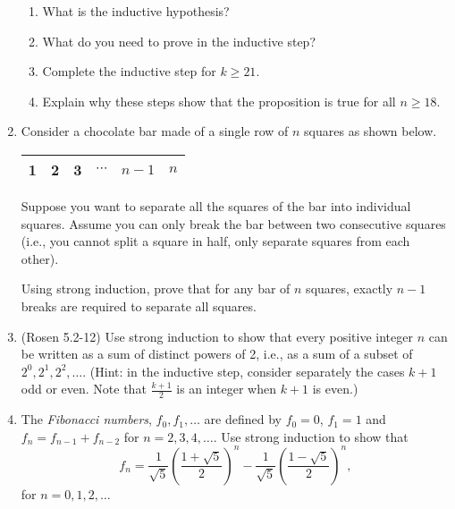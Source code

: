\begin{enumerate}
\begin{enumerate}
\item \streasy What is the inductive hypothesis?

\item \streasy What do you need to prove in the inductive step?

\item \strhard Complete the inductive step for $k \geq 21$.
  
\item \strmedium Explain why these steps show that the proposition is true for all $n \geq 18$.
\end{enumerate}

\item \strmedium Consider a chocolate bar made of a single row of $n$ squares as shown below.

\begin{center}
\begin{tabular}{|C{8mm}||C{8mm}||C{8mm}||C{8mm}||C{8mm}||C{8mm}|}
 & 2 & 3 & $\cdots$ & $n{-}1$ & $n$ \\
\hline 
\end{tabular}
\end{center}

Suppose you want to separate all the squares of the bar into individual squares. Assume you can only break the bar between two consecutive squares (i.e., you cannot split a square in half, only separate squares from each other).

Using strong induction, prove that for any bar of $n$ squares, exactly $n-1$ breaks are required to separate all squares.

\item \strhard (Rosen 5.2-12) Use strong induction to show that every positive integer $n$ can be written as a sum of distinct powers of 2, i.e., as a sum of a subset of $2^0, 2^1, 2^2, \dots$. 
(Hint: in the inductive step, consider separately the cases $k+1$ odd or even. Note that $\frac{k+1}{2}$ is an integer when $k+1$ is even.)

\item \strmedium The \textit{Fibonacci numbers}, $f_{0},f_{1},\dots$ are defined by $f_{0}=0$, $f_{1}=1$ and $f_{n}=f_{n-1}+f_{n-2}$ for $n=2,3,4,\dots$. Use strong induction to show that
\begin{equation*}
f_n=\frac{1}{\sqrt{5}}\left(\frac{1+\sqrt{5}}{2}\right)^{n}
- \frac{1}{\sqrt{5}}\left(\frac{1-\sqrt{5}}{2}\right)^{n},
\end{equation*}
for $n=0,1,2,\dots$
\end{enumerate}



